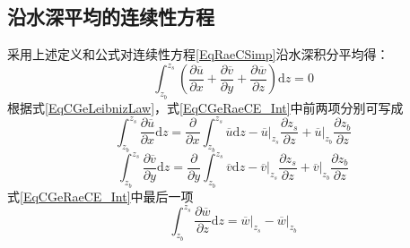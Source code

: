                 \subsection{沿水深平均的连续性方程}
                采用上述定义和公式对连续性方程\eqref{EqRaeCSimp}沿水深积分平均得：
                \begin{equation}
                  \int_{z_{b}}^{ z_{s}}\!
                  \left(
                    \frac{\partial \overline{u}}{\partial x} +
                    \frac{\partial \overline{v}}{\partial y} +
                    \frac{\partial \overline{w}}{\partial z}
                  \right)
                  \mathrm{d}z
                  =
                  0
                  \label{EqCGeRaeCE_Int}
                \end{equation}
                根据式\eqref{EqCGeLeibnizLaw}，式\eqref{EqCGeRaeCE_Int}中前两项分别可写成
                \begin{equation}
                  \int_{z_{b}}^{ z_{s}}\!
                  \frac{\partial \overline{u}}{\partial x}
                  \mathrm{d}z
                  =
                  \frac{\partial}{\partial x}
                  \int_{z_{b}}^{ z_{s}}\!
                  \overline{u}
                  \mathrm{d}z
                  -
                  \left.\overline{u}\right|_{z_{s}}
                    \frac{\partial z_{s}}{\partial z}
                    +
                    \left.\overline{u}\right|_{z_{b}}
                      \frac{\partial z_{b}}{\partial z}
                      \label{EqCGeRaeCE_Int_x}
                    \end{equation}
                    \begin{equation}
                      \int_{z_{b}}^{ z_{s}}\!
                      \frac{\partial \overline{v}}{\partial y}
                      \mathrm{d}z
                      =
                      \frac{\partial}{\partial y}
                      \int_{z_{b}}^{ z_{s}}\!
                      \overline{v}
                      \mathrm{d}z
                      -
                      \left.\overline{v}\right|_{z_{s}}
                        \frac{\partial z_{s}}{\partial z}
                        +
                        \left.\overline{v}\right|_{z_{b}}
                          \frac{\partial z_{b}}{\partial z}
                          \label{EqCGeRaeCE_Int_y}
                        \end{equation}
                        式\eqref{EqCGeRaeCE_Int}中最后一项
                        \begin{equation}
                          \int_{z_{b}}^{ z_{s}}\!
                          \frac{\partial \overline{w}}{\partial z}
                          \mathrm{d}z
                          =
                          \left.\overline{w}\right|_{z_{s}}
                            -
                            \left.\overline{w}\right|_{z_{b}}
                              \label{EqCGeRaeCE_Int_z}
                            \end{equation}
